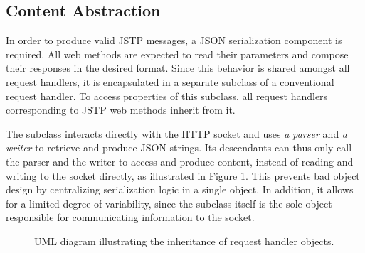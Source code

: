 \subsection{Content Abstraction}
In order to produce valid JSTP messages, a JSON serialization component is required. All web methods are expected to read their parameters and compose their responses in the desired format. Since this behavior is shared amongst all request handlers, it is encapsulated in a separate subclass of a conventional request handler. To access properties of this subclass, all request handlers corresponding to JSTP web methods inherit from it.

The subclass interacts directly with the HTTP socket and uses \textit{a parser} and \textit{a writer} to retrieve and produce JSON strings. Its descendants can thus only call the parser and the writer to access and produce content, instead of reading and writing to the socket directly, as illustrated in Figure \ref{fig:request-handlers}. This prevents bad object design by centralizing serialization logic in a single object. In addition, it allows for a limited degree of variability, since the subclass itself is the sole object responsible for communicating information to the socket.

\begin{figure}[t]
\begin{center}

\caption[UML diagram illustrating handler inheritance.]{UML diagram illustrating the inheritance of request handler objects.}
\label{fig:request-handlers}
\end{center}
\end{figure}

